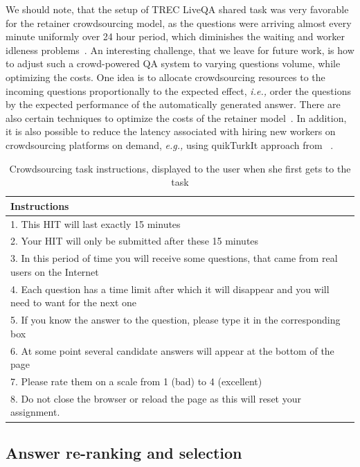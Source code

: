 \documentclass[letterpaper]{article}
\makeatletter
\newcommand{\eg}{\textit{e.g.,}\@\xspace}
\newcommand{\ie}{\textit{i.e.,}\@\xspace}
\makeatother
\begin{document}
We should note, that the setup of TREC LiveQA shared task was very favorable for the retainer crowdsourcing model, as the questions were arriving almost every minute uniformly over 24 hour period, which diminishes the waiting and worker idleness problems~\cite{Lasecki:2013:CCC:2501988.2502057}.
An interesting challenge, that we leave for future work, is how to adjust such a crowd-powered QA system to varying questions volume, while optimizing the costs.
One idea is to allocate crowdsourcing resources to the incoming questions proportionally to the expected effect, \ie order the questions by the expected performance of the automatically generated answer.
There are also certain techniques to optimize the costs of the retainer model~\cite{bernstein2012analytic}.
In addition, it is also possible to reduce the latency associated with hiring new workers on crowdsourcing platforms on demand, \eg using quikTurkIt approach from ~\cite{bigham2010vizwiz}.

\begin{table}[ht]
\centering
\begin{tabular}{| p{7.8cm} |}
\hline
\textbf{Instructions} \\
\hline
1. This HIT will last exactly 15 minutes\\
2. Your HIT will only be submitted after these 15 minutes\\
3. In this period of time you will receive some questions, that came from real users on the Internet\\
4. Each question has a time limit after which it will disappear and you will need to want for the next one\\
5. If you know the answer to the question, please type it in the corresponding box\\
6. At some point several candidate answers will appear at the bottom of the page\\
7. Please rate them on a scale from 1 (bad) to 4 (excellent)\\
8. Do not close the browser or reload the page as this will reset your assignment.\\
\hline
\end{tabular}
\caption{Crowdsourcing task instructions, displayed to the user when she first gets to the task}
\label{table:crowd_instructions}
\end{table}

\subsection{Answer re-ranking and selection}
\label{sec:system:reranking}
\end{document}
